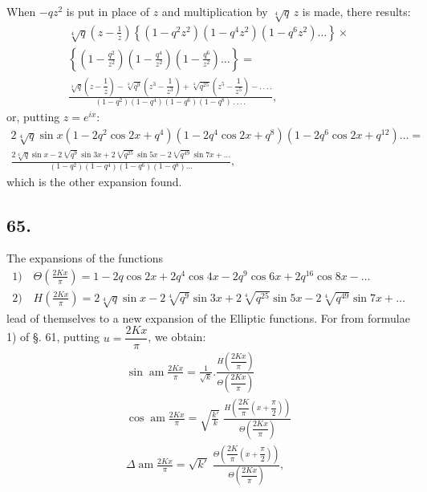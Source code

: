 \documentclass{article}
\begin{document}
When $-qz^{2}$ is put in place of $z$ and multiplication by $\sqrt[4]{q}\,z$ is made, there results:
\[
\begin{gathered}
\sqrt[4]{q}\left(z-\frac{1}{z}\right)\left\{(1-q^{2}z^{2})(1-q^{4}z^{2})(1-q^{6}z^{2})\ldots\right\}\times\\[1.5ex]
\left\{\left(1-\frac{q^{2}}{z^{2}}\right)\left(1-\frac{q^{4}}{z^{2}}\right)\left(1-\frac{q^{6}}{z^{2}}\right)\ldots\right\}=\\[1.5ex]
\frac{\sqrt[4]{q}\left(z-\dfrac{1}{z}\right)-\sqrt[4]{q^{9}}\left(z^{3}-\dfrac{1}{z^{3}}\right)+\sqrt[4]{q^{25}}\left(z^{5}-\dfrac{1}{z^{5}}\right)-.\,.\,.\,.}{(1-q^{2})(1-q^{4})(1-q^{6})(1-q^{8})\,.\,.\,.\,.},
\end{gathered}
\]
or, putting $z=e^{ix}$:
\[
\begin{gathered}
2\sqrt[4]{q}\sin x(1-2q^{2}\cos 2x+q^{4})(1-2q^{4}\cos 2x+q^{8})(1-2q^{6}\cos 2x+q^{12})\ldots=\\[1.5ex]
\frac{2\sqrt[4]{q}\sin x-2\sqrt[4]{q^{9}}\sin 3x+2\sqrt[4]{q^{25}}\sin 5x-2\sqrt[4]{q^{49}}\sin 7x+\ldots}{(1-q^{2})(1-q^{4})(1-q^{6})(1-q^{8})\ldots},
\end{gathered}
\]
which is the other expansion found.

\subsection*{65.}

The expansions of the functions
\[
\begin{gathered}
\text{1)}\quad\Theta\left(\frac{2Kx}{\pi}\right)=1-2q\cos 2x+2q^{4}\cos 4x-2q^{9}\cos 6x+2q^{16}\cos 8x-\ldots\\[1.5ex]
\text{2)}\quad H\left(\frac{2Kx}{\pi}\right)=2\sqrt[4]{q}\sin x-2\sqrt[4]{q^{9}}\sin 3x+2\sqrt[4]{q^{25}}\sin 5x-2\sqrt[4]{q^{49}}\sin 7x+\ldots
\end{gathered}
\]
lead of themselves to a new expansion of the Elliptic functions. For from formulae 1) of §. 61, putting $u=\dfrac{2Kx}{\pi}$, we obtain:
\[
\begin{gathered}
\sin\operatorname{am}\frac{2Kx}{\pi}=\frac{1}{\sqrt{k}}.\frac{H\left(\dfrac{2Kx}{\pi}\right)}{\Theta\left(\dfrac{2Kx}{\pi}\right)}\\[2ex]
\cos\operatorname{am}\frac{2Kx}{\pi}=\sqrt{\frac{k'}{k}}\;\frac{H\left(\dfrac{2K}{\pi}\left(x+\dfrac{\pi}{2}\right)\right)}{\Theta\left(\dfrac{2Kx}{\pi}\right)}\\[2ex]
\Delta\operatorname{am}\frac{2Kx}{\pi}=\sqrt{k'}\;\frac{\Theta\left(\dfrac{2K}{\pi}\left(x+\dfrac{\pi}{2}\right)\right)}{\Theta\left(\dfrac{2Kx}{\pi}\right)},
\end{gathered}
\]
\end{document}
